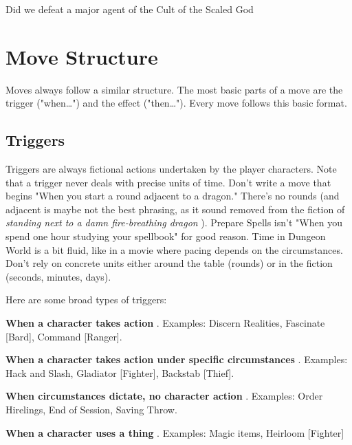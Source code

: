          
\item Did we defeat a major agent of the Cult of the Scaled God

       
\stopitemize
       
\section{Move Structure}    
       

Moves always follow a similar structure. The most basic parts of a move are the trigger ("when…") and the effect ("then…"). Every move follows this basic format.

       
\subsection{Triggers}   
       

Triggers are always fictional actions undertaken by the player characters. Note that a trigger never deals with precise units of time. Don't write a move that begins "When you start a round adjacent to a dragon." There's no rounds (and adjacent is maybe not the best phrasing, as it sound removed from the fiction of {\em standing next to a damn fire-breathing dragon} ). Prepare Spells isn't "When you spend one hour studying your spellbook" for good reason. Time in Dungeon World is a bit fluid, like in a movie where pacing depends on the circumstances. Don't rely on concrete units either around the table (rounds) or in the fiction (seconds, minutes, days).

       

Here are some broad types of triggers:

       
\startitemize[1,packed]
         
\item            {\bf When a character takes action} . Examples: Discern Realities, Fascinate [Bard], Command [Ranger].

         
\item            {\bf When a character takes action under specific circumstances} . Examples: Hack and Slash, Gladiator [Fighter], Backstab [Thief].

         
\item            {\bf When circumstances dictate, no character action} . Examples: Order Hirelings, End of Session, Saving Throw.

         
\item            {\bf When a character uses a thing} . Examples: Magic items, Heirloom [Fighter]

